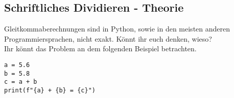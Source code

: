 \subsection{Schriftliches Dividieren - Theorie }
Gleitkommaberechnungen sind in Python, sowie in den meisten anderen Programmiersprachen, nicht exakt. Könnt ihr euch denken, wieso?\\
Ihr könnt das Problem an dem folgenden Beispiel betrachten.
\begin{lstlisting}
a = 5.6
b = 5.8
c = a + b
print(f"{a} + {b} = {c}")
\end{lstlisting}
